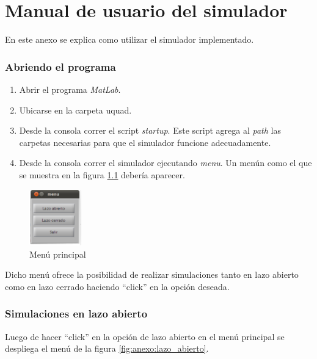 \documentclass[main]{subfiles}
\begin{document}
\chapter{Manual de usuario del simulador}
\label{chap:anexo_simulador}

En este anexo se explica como utilizar el simulador implementado. 

\subsection*{Abriendo el programa}

\begin{enumerate}
\item Abrir el programa \emph{MatLab}.
\item Ubicarse en la carpeta uquad.
\item Desde la consola correr el script \emph{startup}. Este script agrega al \emph{path} las carpetas necesarias para que el simulador funcione adecuadamente.
\item Desde la consola correr el simulador ejecutando \emph{menu}. Un men\'un como el que se muestra en la figura \ref{fig:menu} deber\'ia aparecer.
\end{enumerate}

\begin{figure}
\centering
  \includegraphics[width=0.2\textwidth]{./pics_anexo_simulador/menu.pdf}
\caption{Men\'u principal}
\label{fig:menu}
\end{figure}
Dicho men\'u ofrece la posibilidad de realizar simulaciones tanto en lazo abierto como en lazo cerrado haciendo ``click'' en la opci\'on deseada.\\

\subsection*{Simulaciones en lazo abierto}
Luego de hacer ``click'' en la opci\'on de lazo abierto en el men\'u principal se despliega el men\'u de la figura \ref{fig:anexo:lazo_abierto}. 
\end{document}
